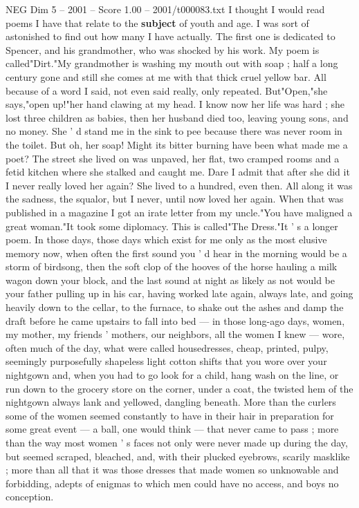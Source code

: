 \begin{textsample}{NEG Dim 5 – 2001 – Score 1.00 – 2001/t000083.txt}  \label{ex:f5_neg_031}
I thought I would read poems I have that relate to the \textbf{subject} of youth and age.
I was sort of astonished to find out how many I have actually.
The first one is dedicated to Spencer, and his grandmother, who was shocked by his work.
My poem is called"Dirt."My grandmother is washing my mouth out with soap ; half a long century gone and still she comes at me with that thick cruel yellow bar.
All because of a word I said, not even said really, only repeated.
But"Open,"she says,"open up!"her hand clawing at my head.
I know now her life was hard ; she lost three children as babies, then her husband died too, leaving young sons, and no money.
She ' d stand me in the sink to pee because there was never room in the toilet.
But oh, her soap!
Might its bitter burning have been what made me a poet?
The street she lived on was unpaved, her flat, two cramped rooms and a fetid kitchen where she stalked and caught me.
Dare I admit that after she did it I never really loved her again?
She lived to a hundred, even then.
All along it was the sadness, the squalor, but I never, until now loved her again.
When that was published in a magazine I got an irate letter from my uncle."You have maligned a great woman."It took some diplomacy.
This is called"The Dress."It ' s a longer poem.
In those days, those days which exist for me only as the most elusive memory now, when often the first sound you ' d hear in the morning would be a storm of birdsong, then the soft clop of the hooves of the horse hauling a milk wagon down your block, and the last sound at night as likely as not would be your father pulling up in his car, having worked late again, always late, and going heavily down to the cellar, to the furnace, to shake out the ashes and damp the draft before he came upstairs to fall into bed — in those long-ago days, women, my mother, my friends ' mothers, our neighbors, all the women I knew — wore, often much of the day, what were called housedresses, cheap, printed, pulpy, seemingly purposefully shapeless light cotton shifts that you wore over your nightgown and, when you had to go look for a child, hang wash on the line, or run down to the grocery store on the corner, under a coat, the twisted hem of the nightgown always lank and yellowed, dangling beneath.
More than the curlers some of the women seemed constantly to have in their hair in preparation for some great event — a ball, one would think — that never came to pass ; more than the way most women ' s faces not only were never made up during the day, but seemed scraped, bleached, and, with their plucked eyebrows, scarily masklike ; more than all that it was those dresses that made women so unknowable and forbidding, adepts of enigmas to which men could have no access, and boys no conception.

\end{textsample}
